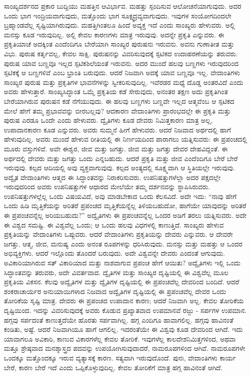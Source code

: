 ಸಾಂಖ್ಯದರ್ಶನದ ಪ್ರಕಾರ ಬುದ್ದಿಯು ಮಹತ್ತಿನ ಆವಿರ್ಭಾವ. ಮಹತ್ತು ಸ್ಪಂದಿಸುವ ಆಲೋಚನೆಯಾಗುವುದು. ಅದರ ಒಂದು ಭಾಗ ಇಂದ್ರಿಯವಾಗುವುದು, ಮತ್ತೊಂದು ಭಾಗ ಸೂಕ್ಷ್ಮದ್ರವ್ಯವಾಗುವುದು. ಇವುಗಳ ಸಂಯೋಗದಿಂದಲೇ ಬ್ರಹ್ಮಾಂಡವೆಲ್ಲ ಸೃಷ್ಟಿಯಾಗಿರುವುದು. ಮಹತ್ತಿಗಿಂತಲೂ ಹಿಂದೆ ಅವ್ಯಕ್ತ ಇದೆ ಎಂದು ಸಾಂಖ್ಯರು ಹೇಳುವರು. ಅಲ್ಲಿ ಮನಸ್ಸು ಕೂಡ ಇರುವುದಿಲ್ಲ. ಅಲ್ಲಿ ಕೇವಲ ಕಾರಣಗಳು ಮಾತ್ರ ಇರುವುವು. ಅದನ್ನೇ ಪ್ರಕೃತಿ ಎನ್ನುವರು. ಈ ಪ್ರಕೃತಿಯಾಚೆ ಅದಕ್ಕಿಂತ ಎಂದೆಂದಿಗೂ ಬೇರೆಯಾಗಿ ಸಾಂಖ್ಯರ ಪುರುಷನು ಇರುವನು. ಅವನು ಗುಣಾತೀತ ಮತ್ತು ವಿಭು. ಪುರುಷ ಕರ್ತೃವಲ್ಲ, ಕೇವಲ ಸಾಕ್ಷಿ. ಪುರುಷನನ್ನು ವಿವರಿಸುವುದಕ್ಕೆ ಸ್ಪಟಿಕದ ಉದಾಹರಣೆಯನ್ನು ತರುವರು. ಪುರುಷ ಯಾವ ಬಣ್ಣವೂ ಇಲ್ಲದ ಸ್ಪಟಿಕಶಿಲೆಯಂತೆ ಇರುವನು. ಅದರ ಮುಂದೆ ಹಲವು ಬಣ್ಣಗಳು ಇರುವುದರಿಂದ ಸ್ಪಟಿಕಕ್ಕೆ ಆ ಬಣ್ಣಗಳಿವೆ ಎಂಬ ಭ್ರಾಂತಿ ಬರುವುದು. ಆದರೆ ನಿಜವಾಗಿ ಅದಕ್ಕೆ ಯಾವ ಬಣ್ಣವೂ ಇಲ್ಲ. ವೇದಾಂತಿಗಳು ಸಾಂಖ್ಯರ ಪುರುಷ ಮತ್ತು ಪ್ರಕೃತಿಗಳ ಭಾವನೆಗಳನ್ನು ಸ್ವೀಕರಿಸುವುದಿಲ್ಲ. ಇವೆರಡರ ಮಧ್ಯೆ ದೊಡ್ಡ ಅಂತರವಿದೆ ಎಂದು ಅವರು ಹೇಳುತ್ತಾರೆ. ಸಾಂಖ್ಯಸಿದ್ಧಾಂತ ಒಮ್ಮೆ ಪ್ರಕೃತಿಯ ಕಡೆ ಸೇರುವುದು, ಅನಂತರ ತಕ್ಷಣ ಅದು ಪ್ರಕೃತಿಗಿಂತ ಬೇರೆಯಾಗಿರುವ ಪುರುಷನ ಕಡೆ ನೆಗೆಯುವುದು. ಈ ಹಲವು ಬಣ್ಣಗಳು ಬಣ್ಣವೇ ಇಲ್ಲದ ಆತ್ಮವೆಂಬ ಆ ಸ್ಪಟಿಕದ ಮೇಲೆ ಹೇಗೆ ತಮ್ಮ ಪ್ರಭಾವವನ್ನು ಬೀರಬಲ್ಲವು? ಆದಕಾರಣ ವೇದಾಂತಿಗಳು ಪ್ರಾರಂಭದಲ್ಲೇ ಈ ಪ್ರಕೃತಿ ಮತ್ತು ಪುರುಷ ಎರಡೂ ಒಂದೇ ಎಂದು ಹೇಳುವರು. ದ್ವೈತಿಗಳು ಕೂಡ ದೇವರು ನಿಮಿತ್ತಕಾರಣ ಮಾತ್ರ ಅಲ್ಲ, ಉಪಾದಾನಕಾರಣ ಕೂಡ ಎನ್ನುವರು. ಅವರು ಸುಮ್ಮನೆ ಹೀಗೆ ಹೇಳುವರು. ಆದರೆ ನಿಜವಾದ ಅರ್ಥದಲ್ಲಿ ಹಾಗೆ ಹೇಳುವುದಿಲ್ಲ. ಅವರು ಮುಂದೆ ಹೇಳುವ ರೀತಿಯಲ್ಲಿ ಈ ನಿರ್ಣಯದಿಂದ ಪಾರಾಗಲು ಯತ್ನಿಸುವರು: ಈ ಪ್ರಪಂಚದಲ್ಲಿ ಮೂರು ವಸ್ತುಗಳಿವೆ. ಅವೇ ಈಶ್ವರ, ಜೀವ ಮತ್ತು ಜಗತ್ತು. ಜೀವ ಮತ್ತು ಜಗತ್ತು ದೇವರ ದೇಹವಿದ್ದಂತೆ. ಈ ಅರ್ಥದಲ್ಲಿ ದೇವರು ಮತ್ತು ಜಗತ್ತು ಒಂದು ಎನ್ನಬಹುದು. ಆದರೆ ಪ್ರಕೃತಿ ಮತ್ತು ಜೀವ ಎಂದೆಂದಿಗೂ ಬೇರೆ ಬೇರೆ ಇರುವುವು. ಕಲ್ಪದ ಆದಿಯಲ್ಲಿ ಅವು ವ್ಯಕ್ತವಾಗುವುವು. ಕಲ್ಪದ ಅಂತ್ಯದಲ್ಲಿ ಸೂಕ್ಷ್ಮವಾಗಿ ಆ ಸ್ಥಿತಿಯಲ್ಲೇ ಇರುವುವು. ಅದ್ವೈತ ವೇದಾಂತಿಗಳು ಆತ್ಮದ ಈ ಸಿದ್ಧಾಂತವನ್ನು ನಿರಾಕರಿಸುವರು. ಉಪನಿಷತ್ತುಗಳೆಲ್ಲಾ ಅದರ ಪಕ್ಷದಲ್ಲೇ ಇರುವುದರಿಂದ ಅವರು ಉಪನಿಷತ್ತುಗಳ ಆಧಾರದ ಮೇಲೆಯೇ ತಮ್ಮ ದರ್ಶನವನ್ನು ಸ್ಥಾಪಿಸಿರುವರು. ಉಪನಿಷತ್ತುಗಳಲ್ಲೆಲ್ಲ ಒಂದು ವಿಷಯವಿದೆ, ಅವು ಮಾಡಬೇಕಾದ ಒಂದು ಕೆಲಸವಿದೆ. ಅದೇ ಇದು: “ನಾವು ಹೇಗೆ ಒಂದು ಹಿಡಿ ಮೃತ್ತಿಕೆಯನ್ನು ಅರಿತರೆ ಪ್ರಪಂಚದ ಮೃತ್ತಿಕೆಯನ್ನೆಲ್ಲ ತಿಳಿಯಬಹುದೋ, ಹಾಗೆಯೇ ಯಾವುದನ್ನು ಅರಿತರೆ ಈ ಪ್ರಪಂಚವನ್ನೆಲ್ಲ ಅರಿಯಬಹುದು?” ಅದ್ವೈತಿಗಳು ಈ ಪ್ರಪಂಚವನ್ನೆಲ್ಲ ಒಂದರ ಅಡಿಗೆ ತರಲು ಯತ್ನಿಸುವರು. ಅದೇ ಈ ವಿಶ್ವದ ಸಮಷ್ಟಿ. ಈ ವಿಶ್ವವೆಲ್ಲ ಒಂದು; ಆ ಒಂದು ಹಲವು ವಿಧಗಳಲ್ಲಿ ಕಾಣುತ್ತಿದೆ. ಸಾಂಖ್ಯರು ಹೇಳುವ ಪ್ರಕೃತಿಯನ್ನು ವೇದಾಂತಿಗಳು ಒಪ್ಪುವರು. ಆದರೆ ವೇದಾಂತಿಗಳು ಪ್ರಕೃತಿಯನ್ನು ದೇವರು ಎನ್ನುವರು. ಆ ದೇವರೇ ಜಗತ್ತು. ಆತ್ಮ, ಜೀವ, ಮನುಷ್ಯ ಎಂದು ಅನಂತ ರೂಪಗಳನ್ನು ಧರಿಸಿರುವುದು. ಮನಸ್ಸು ಮತ್ತು ಮಹತ್ತು ಆ ಒಂದರ ಅಭಿವ್ಯಕ್ತಿಗಳು. ಆದರೆ ಇಲ್ಲೊಂದು ತೊಂದರೆ ಬರುವುದು. ಅದೇ ವಿಶ್ವವನ್ನೇ ದೇವರು ಎಂದಂತೆ ಆಗುವುದು. ಅವಿಕಾರಿಯಾಗಿರುವ ಸತ್ ವಿಕಾರಿಯಾದ ಮತ್ತು ನಾಶವಾಗುವ ಪ್ರಪಂಚ ಹೇಗೆ ಆಯಿತು? ಅದ್ವೈತಿಗಳು ಇಲ್ಲಿ ಒಂದು ಸಿದ್ಧಾಂತವನ್ನು ತರುವರು, ಅದೇ ವಿವರ್ತವಾದ. ದ್ವೈತಿಗಳ ಮತ್ತು ಸಾಂಖ್ಯರ ದೃಷ್ಟಿಯಲ್ಲಿ ಈ ವಿಶ್ವವೆಲ್ಲ ಮೂಲ ಪ್ರಕೃತಿಯ ವಿಕಸನ. ಕೆಲವು ಅದ್ವೈತಿಗಳ ಮತ್ತು ದ್ವೈತಿಗಳ ದೃಷ್ಟಿಯಲ್ಲಿ ಈ ಪ್ರಪಂಚವೆಲ್ಲ ದೇವರಿಂದ ಬಂದಿದೆ. ಆದರೆ ಶಂಕರಾಚಾರ್ಯರ ಅನುಯಾಯಿಗಳಾದ ನಿಜವಾದ ಅದ್ವೈತಿಗಳ ದೃಷ್ಟಿಯಲ್ಲಿ ಈ ಪ್ರಪಂಚವೆಲ್ಲ ದೇವರ ಒಂದು ತೋರಿಕೆಯ ಸೃಷ್ಟಿ ಮಾತ್ರ. ದೇವರು ಈ ಪ್ರಪಂಚದ ಉಪಾದಾನ ಕಾರಣ; ಆದರೆ ನಿಜವಾಗಿ ಅಲ್ಲ. ಕೇವಲ ತೋರಿಕೆಯ ದೃಷ್ಟಿಯಿಂದ. ಇದನ್ನು ವಿವರಿಸುವುದಕ್ಕೆ ಅವರು ಕೊಡುವ ಪ್ರಖ್ಯಾತವಾದ ಉಪಮಾನವೆ ರಜ್ಜು - ಸರ್ಪಗಳ ಉಪಮಾನ. ಹಗ್ಗವು ಸರ್ಪದಂತೆ ಕಾಣುತ್ತದೆಯೇ ಹೊರತು ಸರ್ಪವಾಗಿಲ್ಲ. ಹಗ್ಗ ಎಂದಿಗೂ ಹಾವಾಗಲಿಲ್ಲ. ಹಗ್ಗವು ಹಾವಿನಂತೆ ಕಂಡಿತು, ಅಷ್ಟೆ. ಆದರೆ ನಿಜವಾಗಿಯೂ ಹಾಗೆ ಆಗಲಿಲ್ಲ. ಇದರಂತೆಯೇ ಈ ವಿಶ್ವವು ಕೂಡ ದೇವರಿಂದ ಆಗಿದೆ. ಇದು ಯಾವಾಗಲೂ ಅವಿಕಾರಿ, ಕಾಣುವ ವಿಕಾರಗಳೆಲ್ಲ ಕೇವಲ ತೋರಿಕೆ. ಇವುಗಳೆಲ್ಲ ಕಾಲದೇಶನಿಮಿತ್ತಗಳಿಂದ, ಅಥವಾ ಮತ್ತೂ ಶ್ರೇಷ್ಠವಾದ ಮನಶ್ಶಾಸ್ತ್ರದ ಪದವನ್ನು ಉಪಯೋಗಿಸುವುದಾದರೆ, ನಾಮರೂಪಗಳಿಂದ ಆಗಿವೆ. ನಾಮರೂಪಗಳೇ ಒಂದಕ್ಕೂ ಮತ್ತೊಂದಕ್ಕೂ ಇರುವ ವ್ಯತ್ಯಾಸಕ್ಕೆ ಕಾರಣ. ಸತ್ಯವಾಗಿ ಇರುವುದೊಂದೆ. ಪುನಃ, ವೇದಾಂತಿಗಳು ಕಾರ್ಯ ಬೇರೆ, ಕಾರಣ ಬೇರೆ ಇದೆ ಎಂದು ಒಪ್ಪಿಕೊಳ್ಳುವುದಿಲ್ಲ. ಕೇವಲ ತೋರಿಕೆಗೆ ಮಾತ್ರ ಹಗ್ಗ ಹಾವಿನಂತೆ ಆಗಿದೆ. 